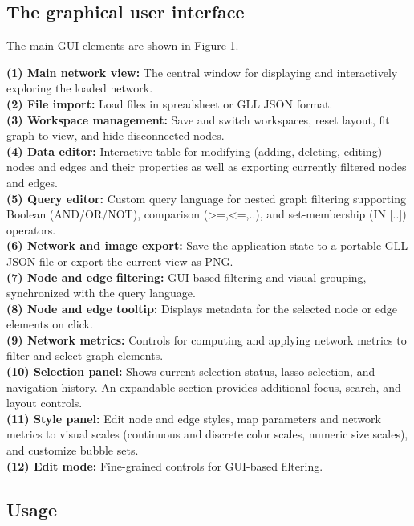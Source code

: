 \subsection{The graphical user interface}
The main GUI elements are shown in Figure 1.

\noindent
\textbf{(1) Main network view:} The central window for displaying and interactively exploring the loaded network. \\
\textbf{(2) File import:} Load files in spreadsheet or GLL JSON format. \\
\textbf{(3) Workspace management:} Save and switch workspaces, reset layout, fit graph to view, and hide disconnected nodes. \\
\textbf{(4) Data editor:} Interactive table for modifying (adding, deleting, editing) nodes and edges and their properties as well as exporting currently filtered nodes and edges. \\
\textbf{(5) Query editor:} Custom query language for nested graph filtering supporting Boolean (AND/OR/NOT), comparison (>=,<=,..), and set-membership (IN [..]) operators. \\
\textbf{(6) Network and image export:} Save the application state to a portable GLL JSON file or export the current view as PNG. \\
\textbf{(7) Node and edge filtering:} GUI-based filtering and visual grouping, synchronized with the query language. \\
\textbf{(8) Node and edge tooltip:} Displays metadata for the selected node or edge elements on click. \\
\textbf{(9) Network metrics:} Controls for computing and applying network metrics to filter and select graph elements. \\
\textbf{(10) Selection panel:} Shows current selection status, lasso selection, and navigation history. An expandable section provides additional focus, search, and layout controls. \\
\textbf{(11) Style panel:} Edit node and edge styles, map parameters and network metrics to visual scales (continuous and discrete color scales, numeric size scales), and customize bubble sets. \\
\textbf{(12) Edit mode:} Fine-grained controls for GUI-based filtering. \\

\subsection{Usage}
